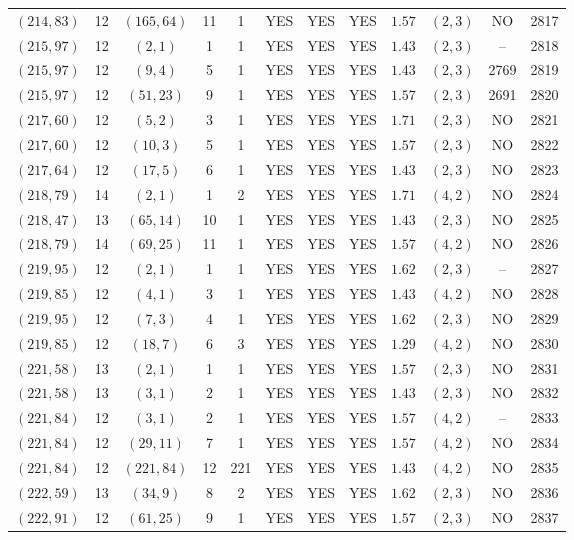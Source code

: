 \begin{longtable}{|c|c|c|c|c|c|c|c|c|c|c|c|}
$(214,83)$ & 12 & $(165,64)$ & 11 & 1 & YES & YES & YES & $1.57$ & $(2,3)$ & NO & 2817\\
$(215,97)$ & 12 & $(2,1)$ & 1 & 1 & YES & YES & YES & $1.43$ & $(2,3)$ & -- & 2818\\
$(215,97)$ & 12 & $(9,4)$ & 5 & 1 & YES & YES & YES & $1.43$ & $(2,3)$ & 2769 & 2819\\
$(215,97)$ & 12 & $(51,23)$ & 9 & 1 & YES & YES & YES & $1.57$ & $(2,3)$ & 2691 & 2820\\
$(217,60)$ & 12 & $(5,2)$ & 3 & 1 & YES & YES & YES & $1.71$ & $(2,3)$ & NO & 2821\\
$(217,60)$ & 12 & $(10,3)$ & 5 & 1 & YES & YES & YES & $1.57$ & $(2,3)$ & NO & 2822\\
$(217,64)$ & 12 & $(17,5)$ & 6 & 1 & YES & YES & YES & $1.43$ & $(2,3)$ & NO & 2823\\
$(218,79)$ & 14 & $(2,1)$ & 1 & 2 & YES & YES & YES & $1.71$ & $(4,2)$ & NO & 2824\\
$(218,47)$ & 13 & $(65,14)$ & 10 & 1 & YES & YES & YES & $1.43$ & $(2,3)$ & NO & 2825\\
$(218,79)$ & 14 & $(69,25)$ & 11 & 1 & YES & YES & YES & $1.57$ & $(4,2)$ & NO & 2826\\
$(219,95)$ & 12 & $(2,1)$ & 1 & 1 & YES & YES & YES & $1.62$ & $(2,3)$ & -- & 2827\\
$(219,85)$ & 12 & $(4,1)$ & 3 & 1 & YES & YES & YES & $1.43$ & $(4,2)$ & NO & 2828\\
$(219,95)$ & 12 & $(7,3)$ & 4 & 1 & YES & YES & YES & $1.62$ & $(2,3)$ & NO & 2829\\
$(219,85)$ & 12 & $(18,7)$ & 6 & 3 & YES & YES & YES & $1.29$ & $(4,2)$ & NO & 2830\\
$(221,58)$ & 13 & $(2,1)$ & 1 & 1 & YES & YES & YES & $1.57$ & $(2,3)$ & NO & 2831\\
$(221,58)$ & 13 & $(3,1)$ & 2 & 1 & YES & YES & YES & $1.43$ & $(2,3)$ & NO & 2832\\
$(221,84)$ & 12 & $(3,1)$ & 2 & 1 & YES & YES & YES & $1.57$ & $(4,2)$ & -- & 2833\\
$(221,84)$ & 12 & $(29,11)$ & 7 & 1 & YES & YES & YES & $1.57$ & $(4,2)$ & NO & 2834\\
$(221,84)$ & 12 & $(221,84)$ & 12 & 221 & YES & YES & YES & $1.43$ & $(4,2)$ & NO & 2835\\
$(222,59)$ & 13 & $(34,9)$ & 8 & 2 & YES & YES & YES & $1.62$ & $(2,3)$ & NO & 2836\\
$(222,91)$ & 12 & $(61,25)$ & 9 & 1 & YES & YES & YES & $1.57$ & $(2,3)$ & NO & 2837\\

\end{longtable}

